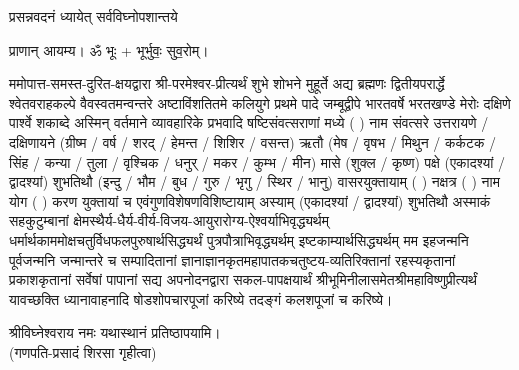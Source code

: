 
\setlength{\parindent}{0pt}




{प्रसन्नवदनं ध्यायेत् सर्वविघ्नोपशान्तये}

प्राणान्  आयम्य।  ॐ भूः + भूर्भुवः॒ सुव॒रोम्।


ममोपात्त-समस्त-दुरित-क्षयद्वारा श्री-परमेश्वर-प्रीत्यर्थं शुभे शोभने मुहूर्ते अद्य ब्रह्मणः
द्वितीयपरार्द्धे श्वेतवराहकल्पे वैवस्वतमन्वन्तरे अष्टाविंशतितमे कलियुगे प्रथमे पादे
जम्बूद्वीपे भारतवर्षे भरतखण्डे मेरोः दक्षिणे पार्श्वे शकाब्दे अस्मिन् वर्तमाने व्यावहारिके
प्रभवादि षष्टिसंवत्सराणां मध्ये (	) नाम संवत्सरे उत्तरायणे / दक्षिणायने
(ग्रीष्म / वर्ष / शरद् / हेमन्त / शिशिर / वसन्त) ऋतौ  (मेष / वृषभ / मिथुन / कर्कटक / सिंह / कन्या / तुला /
वृश्चिक / धनुर् / मकर / कुम्भ / मीन) मासे (शुक्ल / कृष्ण) पक्षे (एकादश्यां / द्वादश्यां) शुभतिथौ
(इन्दु / भौम / बुध / गुरु / भृगु / स्थिर / भानु) वासरयुक्तायाम्
(  ) नक्षत्र (  ) नाम  योग  (  ) करण युक्तायां च एवं\-गुण\-विशेषण\-विशिष्टायाम्
अस्याम् (एकादश्यां / द्वादश्यां) शुभतिथौ
अस्माकं सहकुटुम्बानां क्षेमस्थैर्य-धैर्य-वीर्य-विजय-आयुरारोग्य-ऐश्वर्याभिवृद्ध्यर्थम्
धर्मार्थकाममोक्ष\-चतुर्विधफलपुरुषार्थसिद्ध्यर्थं पुत्रपौत्राभि\-वृद्ध्यर्थम् इष्टकाम्यार्थसिद्ध्यर्थम्
मम इहजन्मनि पूर्वजन्मनि जन्मान्तरे च सम्पादितानां ज्ञानाज्ञानकृतमहा\-पातकचतुष्टय-व्यतिरिक्तानां रहस्यकृतानां प्रकाशकृतानां सर्वेषां पापानां सद्य अपनोदनद्वारा सकल-पापक्षयार्थं श्रीभूमिनीलासमेतश्रीमहाविष्णुप्रीत्यर्थं यावच्छक्ति ध्यानावाहनादि
षोडशोपचारपूजां करिष्ये तदङ्गं कलशपूजां च करिष्ये।


श्रीविघ्नेश्वराय नमः यथास्थानं प्रतिष्ठापयामि।\\
(गणपति-प्रसादं शिरसा गृहीत्वा)

\renewcommand{\devaName}{विष्णु}












